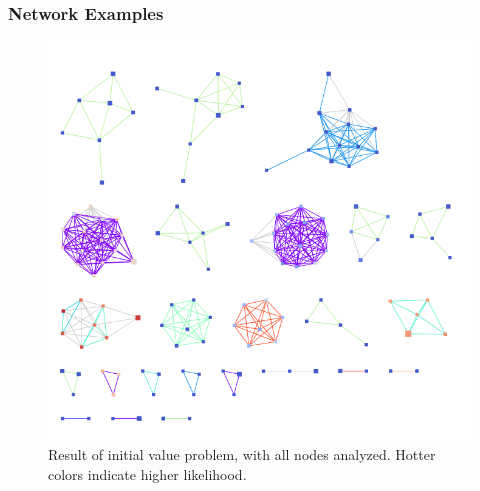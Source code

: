 \documentclass{beamer}
\begin{document}
\begin{frame}
\frametitle{Network Examples}
	\begin{figure}
	\begin{center}
		\includegraphics[scale = 0.25]{../ranked_ivp.png}	
	\end{center}
	\caption{Result of initial value problem, with all nodes analyzed. Hotter colors indicate higher likelihood.}
\end{figure}
\end{frame}
\end{document}
